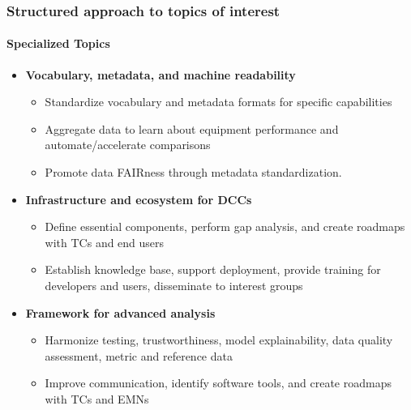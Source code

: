 \documentclass{beamer}
\begin{document}
    \begin{frame}
        \frametitle{Structured approach to topics of interest}
        \framesubtitle{Specialized Topics}
        \begin{itemize}
            \item \textbf{Vocabulary, metadata, and machine readability}
            \begin{itemize}
                \item Standardize vocabulary and metadata formats for specific capabilities
                \item Aggregate data to learn about equipment performance and automate/accelerate comparisons
                \item Promote data FAIRness through metadata standardization.
            \end{itemize}
            \item \textbf{Infrastructure and ecosystem for DCCs}
            \begin{itemize}
                \item Define essential components, perform gap analysis, and create roadmaps with TCs and end users
                \item Establish knowledge base, support deployment, provide training for developers and users, disseminate to interest groups
            \end{itemize}
            \item \textbf{Framework for advanced analysis}
            \begin{itemize}
                \item Harmonize testing, trustworthiness, model explainability, data quality assessment, metric and reference data
                \item Improve communication, identify software tools, and create roadmaps with TCs and EMNs
            \end{itemize}
        \end{itemize}
    \end{frame}
\end{document}
